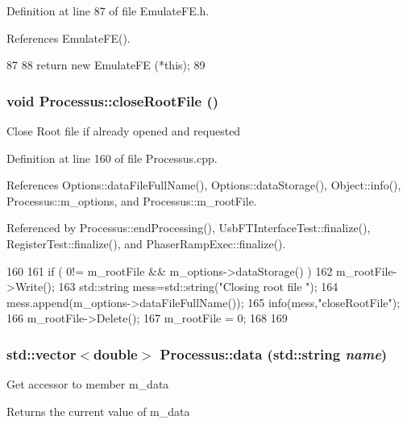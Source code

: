 Definition at line 87 of file EmulateFE.h.

References EmulateFE().


\begin{DoxyCode}
87                     {
88     return new EmulateFE (*this);
89   }
\end{DoxyCode}
\hypertarget{classProcessus_a2f3c41e99da4c738ea3d8f7b0d20a665}{
\subsubsection[{closeRootFile}]{\setlength{\rightskip}{0pt plus 5cm}void Processus::closeRootFile ()}}
\label{classProcessus_a2f3c41e99da4c738ea3d8f7b0d20a665}
Close Root file if already opened and requested 

Definition at line 160 of file Processus.cpp.

References Options::dataFileFullName(), Options::dataStorage(), Object::info(), Processus::m\_\-options, and Processus::m\_\-rootFile.

Referenced by Processus::endProcessing(), UsbFTInterfaceTest::finalize(), RegisterTest::finalize(), and PhaserRampExec::finalize().


\begin{DoxyCode}
160                                 {
161   if ( 0!= m_rootFile && m_options->dataStorage() ){
162     m_rootFile->Write();
163         std::string mess=std::string("Closing root file ");
164         mess.append(m_options->dataFileFullName());
165         info(mess,"closeRootFile");
166     m_rootFile->Delete();
167     m_rootFile = 0;
168   }
169 }
\end{DoxyCode}
\hypertarget{classProcessus_abf4d91fb36707e1d50178bab12d21ae9}{
\subsubsection[{data}]{\setlength{\rightskip}{0pt plus 5cm}std::vector$<$double$>$ Processus::data (std::string {\em name})}}
\label{classProcessus_abf4d91fb36707e1d50178bab12d21ae9}
Get accessor to member m\_\-data \begin{DoxyReturn}{Returns}
the current value of m\_\-data 
\end{DoxyReturn}


